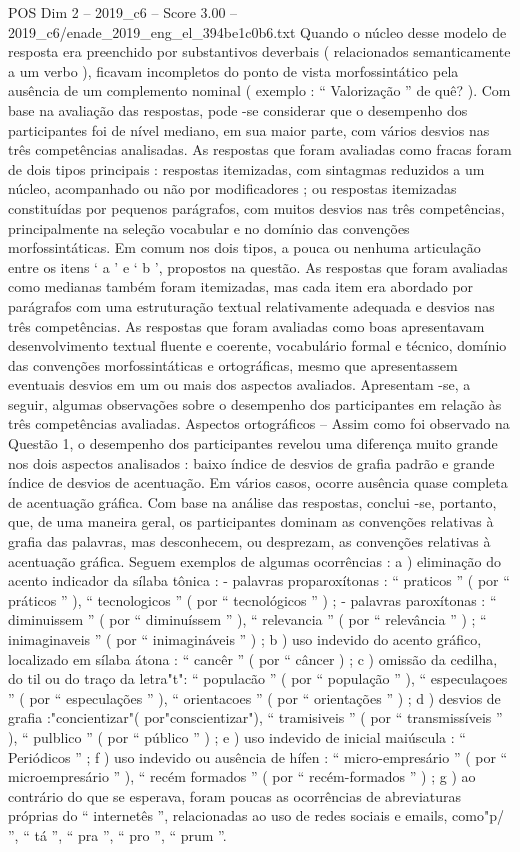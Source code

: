 \begin{textsample}{POS Dim 2 – 2019\_c6 – Score 3.00 – 2019\_c6/enade\_2019\_eng\_el\_394be1c0b6.txt}
Quando o núcleo desse modelo de resposta era preenchido por substantivos deverbais ( relacionados semanticamente a um verbo ), ficavam incompletos do ponto de vista morfossintático pela ausência de um complemento nominal ( exemplo : “ Valorização ” de quê? ).
Com base na avaliação das respostas, pode -se considerar que o desempenho dos participantes foi de nível mediano, em sua maior parte, com vários desvios nas três competências analisadas.
As respostas que foram avaliadas como fracas foram de dois tipos principais : respostas itemizadas, com sintagmas reduzidos a um núcleo, acompanhado ou não por modificadores ; ou respostas itemizadas constituídas por pequenos parágrafos, com muitos desvios nas três competências, principalmente na seleção vocabular e no domínio das convenções morfossintáticas.
Em comum nos dois tipos, a pouca ou nenhuma articulação entre os itens ‘ a ’ e ‘ b ’, propostos na questão.
As respostas que foram avaliadas como medianas também foram itemizadas, mas cada item era abordado por parágrafos com uma estruturação textual relativamente adequada e desvios nas três competências.
As respostas que foram avaliadas como boas apresentavam desenvolvimento textual fluente e coerente, vocabulário formal e técnico, domínio das convenções morfossintáticas e ortográficas, mesmo que apresentassem eventuais desvios em um ou mais dos aspectos avaliados.
Apresentam -se, a seguir, algumas observações sobre o desempenho dos participantes em relação às três competências avaliadas.
Aspectos ortográficos – Assim como foi observado na Questão 1, o desempenho dos participantes revelou uma diferença muito grande nos dois aspectos analisados : baixo índice de desvios de grafia padrão e grande índice de desvios de acentuação.
Em vários casos, ocorre ausência quase completa de acentuação gráfica.
Com base na análise das respostas, conclui -se, portanto, que, de uma maneira geral, os participantes dominam as convenções relativas à grafia das palavras, mas desconhecem, ou desprezam, as convenções relativas à acentuação gráfica.
Seguem exemplos de algumas ocorrências : a ) eliminação do acento indicador da sílaba tônica : - palavras proparoxítonas : “ praticos ” ( por “ práticos ” ), “ tecnologicos ” ( por “ tecnológicos ” ) ; - palavras paroxítonas : “ diminuissem ” ( por “ diminuíssem ” ), “ relevancia ” ( por “ relevância ” ) ; “ inimaginaveis ” ( por “ inimagináveis ” ) ; b ) uso indevido do acento gráfico, localizado em sílaba átona : “ cancêr ” ( por “ câncer ) ; c ) omissão da cedilha, do til ou do traço da letra"t": “ populacão ” ( por “ população ” ), “ especulaçoes ” ( por “ especulações ” ), “ orientacoes ” ( por “ orientações ” ) ; d ) desvios de grafia :"concientizar"( por"conscientizar"), “ tramisiveis ” ( por “ transmissíveis ” ), “ pulblico ” ( por “ público ” ) ; e ) uso indevido de inicial maiúscula : “ Periódicos ” ; f ) uso indevido ou ausência de hífen : “ micro-empresário ” ( por “ microempresário ” ), “ recém formados ” ( por “ recém-formados ” ) ; g ) ao contrário do que se esperava, foram poucas as ocorrências de abreviaturas próprias do “ internetês ”, relacionadas ao uso de redes sociais e emails, como"p/ ”, “ tá ”, “ pra ”, “ pro ”, “ prum ”.

\end{textsample}
